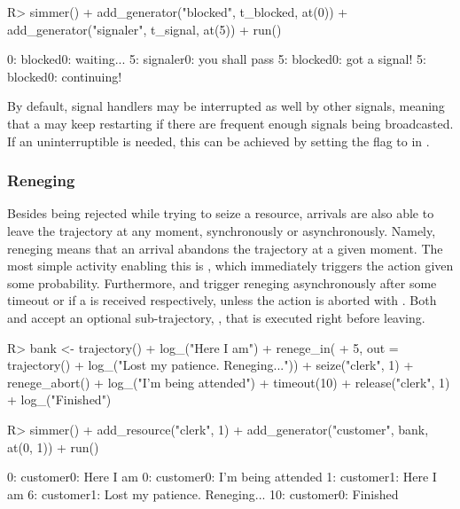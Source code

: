 \documentclass[
  nojss]{jss}
\begin{document}
\begin{CodeChunk}
\begin{CodeInput}
R> simmer() %
+   add_generator("blocked", t_blocked, at(0)) %
+   add_generator("signaler", t_signal, at(5)) %
+   run() %
\end{CodeInput}
\begin{CodeOutput}
0: blocked0: waiting...
5: signaler0: you shall pass
5: blocked0: got a signal!
5: blocked0: continuing!
\end{CodeOutput}
\end{CodeChunk}

By default, signal handlers may be interrupted as well by other signals,
meaning that a  may keep restarting if there are frequent
enough signals being broadcasted. If an uninterruptible 
is needed, this can be achieved by setting the flag 
to  in .

\subsubsection{Reneging}\label{reneging}

Besides being rejected while trying to seize a resource, arrivals are
also able to leave the trajectory at any moment, synchronously or
asynchronously. Namely, reneging means that an arrival abandons the
trajectory at a given moment. The most simple activity enabling this is
, which immediately triggers the action given some
probability. Furthermore,  and 
trigger reneging asynchronously after some timeout  or if a
 is received respectively, unless the action is aborted
with . Both  and
 accept an optional sub-trajectory, , that
is executed right before leaving.

\begin{CodeChunk}
\begin{CodeInput}
R> bank <- trajectory() %
+   log_("Here I am") %
+   renege_in(
+     5, out = trajectory() %
+       log_("Lost my patience. Reneging...")) %
+   seize("clerk", 1) %
+   renege_abort() %
+   log_("I'm being attended") %
+   timeout(10) %
+   release("clerk", 1) %
+   log_("Finished")
\end{CodeInput}
\end{CodeChunk}

\begin{CodeChunk}
\begin{CodeInput}
R> simmer() %
+   add_resource("clerk", 1) %
+   add_generator("customer", bank, at(0, 1)) %
+   run() %
\end{CodeInput}
\begin{CodeOutput}
0: customer0: Here I am
0: customer0: I'm being attended
1: customer1: Here I am
6: customer1: Lost my patience. Reneging...
10: customer0: Finished
\end{CodeOutput}
\end{CodeChunk}
\end{document}

